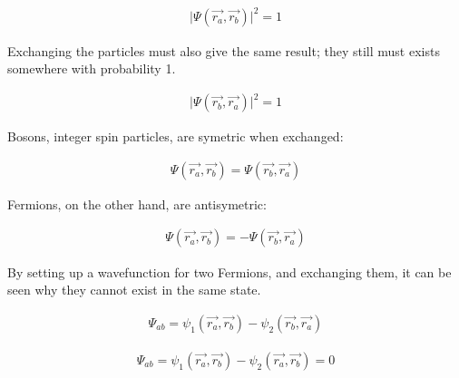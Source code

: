 \begin{equation}
  \begin{split}
    \lvert \Psi(\vec{r_a}, \vec{r_b}) \rvert ^2 = 1
  \end{split}
  \label{eq:eqEulersFormula}
\end{equation}

Exchanging the particles must also give the same result; they still must exists somewhere with probability 1.

\begin{equation}
  \begin{split}
    \lvert \Psi(\vec{r_b}, \vec{r_a}) \rvert ^2 = 1
  \end{split}
  \label{eq:eqEulersFormula}
\end{equation}

Bosons, integer spin particles, are symetric when exchanged:

\begin{equation}
  \begin{split}
  \Psi(\vec{r_a}, \vec{r_b}) = \Psi(\vec{r_b}, \vec{r_a})
  \end{split}
  \label{eq:eqEulersFormula}
\end{equation}

Fermions, on the other hand, are antisymetric:

\begin{equation}
  \begin{split}
  \Psi(\vec{r_a}, \vec{r_b}) = - \Psi(\vec{r_b}, \vec{r_a})
  \end{split}
  \label{eq:eqEulersFormula}
\end{equation}

By setting up a wavefunction for two Fermions, and exchanging them, it can be seen why they cannot exist in the same state.

\begin{equation}
  \begin{split}
  \Psi_{ab} =  \psi_{1}(\vec{r_a}, \vec{r_b}) - \psi_{2}(\vec{r_b}, \vec{r_a})
  \end{split}
  \label{eq:eqEulersFormula}
\end{equation}

\begin{equation}
  \begin{split}
  \Psi_{ab} =  \psi_{1}(\vec{r_a}, \vec{r_b}) - \psi_{2}(\vec{r_a}, \vec{r_b}) = 0
  \end{split}
  \label{eq:eqEulersFormula}
\end{equation}


